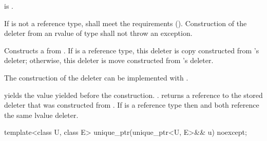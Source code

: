 \begin{itemdescr}
\pnum
\constraints
{} is .

\pnum
\requires If  is not a reference type,
 shall meet the 
requirements ().
Construction
of the deleter from an rvalue of type  shall not
throw an exception.

\pnum
\effects
Constructs a  from
. If  is a reference type, this
deleter is copy constructed from 's deleter; otherwise, this
deleter is move constructed from 's deleter.
\begin{note}
The
construction of the deleter can be implemented with .
\end{note}

\pnum
\ensures
{} yields the value 
yielded before the construction. .
 returns a reference
to the stored deleter that was constructed from
. If  is a reference type then
 and  both reference
the same lvalue deleter.
\end{itemdescr}

%
\begin{itemdecl}
template<class U, class E> unique_ptr(unique_ptr<U, E>&& u) noexcept;
\end{itemdecl}

